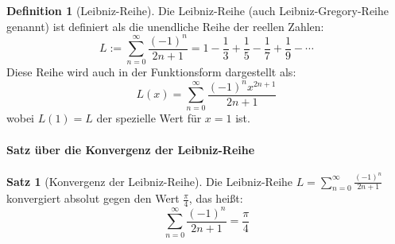 \documentclass[a4paper, 12pt, twoside, openright]{report}
\theoremstyle{definition}
\newtheorem{definition}[theorem]{Definition}
\theoremstyle{definition}
\newtheorem{satz}{Satz}[chapter]
\begin{document}
\begin{definition}[Leibniz-Reihe]
Die Leibniz-Reihe (auch Leibniz-Gregory-Reihe genannt) ist definiert als die unendliche Reihe der reellen Zahlen:
\begin{equation}
L := \sum_{n=0}^{\infty} \frac{(-1)^n}{2n+1} = 1 - \frac{1}{3} + \frac{1}{5} - \frac{1}{7} + \frac{1}{9} - \cdots
\end{equation}
Diese Reihe wird auch in der Funktionsform dargestellt als:
\begin{equation}
L(x) = \sum_{n=0}^{\infty} \frac{(-1)^n x^{2n+1}}{2n+1}
\end{equation}
wobei $L(1) = L$ der spezielle Wert für $x=1$ ist.
\end{definition}

\paragraph{Satz über die Konvergenz der Leibniz-Reihe}

\begin{satz}[Konvergenz der Leibniz-Reihe]
Die Leibniz-Reihe $L = \sum_{n=0}^{\infty} \frac{(-1)^n}{2n+1}$ konvergiert absolut gegen den Wert $\frac{\pi}{4}$, das heißt:
\begin{equation}
\sum_{n=0}^{\infty} \frac{(-1)^n}{2n+1} = \frac{\pi}{4}
\end{equation}
\end{satz}
\end{document}
